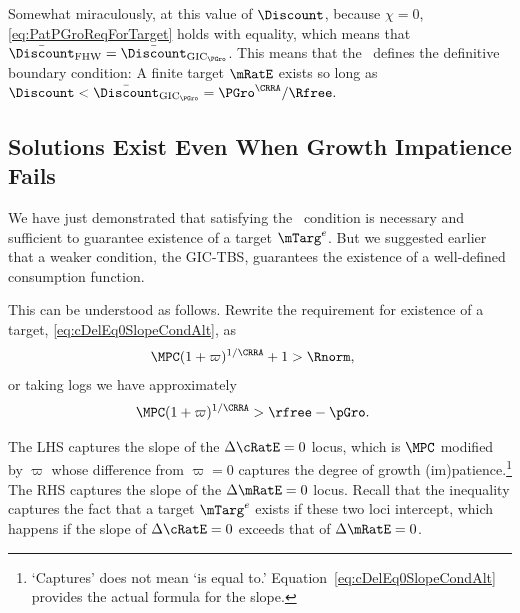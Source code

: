 \documentclass{handout}
\begin{document}
Somewhat miraculously, at this value of $\Discount$, because $\chi=0$, \eqref{eq:PatPGroReqForTarget} holds with equality, which means that $\DiscountMaxGICWhenFHWCTBSHolds=\DiscountMaxGICPGro$.  This means that the \GICPGro~defines the definitive boundary condition:  A finite target $\mRatE$ exists so long as $\Discount < \DiscountMaxGICPGro = \PGro^{\CRRA}/\Rfree.$

\subsection{Solutions Exist Even When Growth Impatience Fails}

We have just demonstrated that satisfying the \GICPGro~condition is necessary and sufficient to guarantee existence of a target $\mTarg^{e}$.  But we suggested earlier that a weaker condition, the GIC-TBS, guarantees the existence of a well-defined consumption function.

This can be understood as follows.  Rewrite the requirement for existence of a target, \eqref{eq:cDelEq0SlopeCondAlt}, as 
\begin{equation}\begin{gathered}\begin{aligned}
  \MPCU (1+\varpi)^{1/\CRRA}+1 & >   \Rnorm  \label{eq:cDelEq0SlopeCondAltAlt}
,\end{aligned}\end{gathered}\end{equation}
or taking logs we have approximately 
\begin{equation}\begin{gathered}\begin{aligned}
  \MPCU (1+\varpi)^{1/\CRRA} & >   \rfree-\pGro \label{eq:cDelEq0SlopeCondLog}
.\end{aligned}\end{gathered}\end{equation}

The LHS captures the slope of the $\dcEqZero$ locus, which is $\MPCU$ modified by $\varpi$ whose difference from $\varpi=0$ captures the degree of growth (im)patience.\footnote{`Captures' does not mean `is equal to.'  Equation~\eqref{eq:cDelEq0SlopeCondAlt} provides the actual formula for the slope.}  The RHS captures the slope of the $\dmEqZero$ locus.  Recall that the inequality captures the fact that a target $\mTarg^{e}$ exists if these two loci intercept, which happens if the slope of $\dcEqZero$ exceeds that of $\dmEqZero$.
\end{document}
